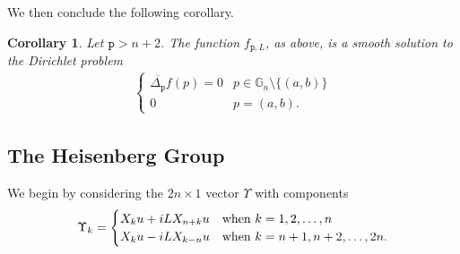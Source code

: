 \documentclass[12pt]{amsart}
\theoremstyle{plain}
\newtheorem{corollary}[theorem]{Corollary}
\theoremstyle{definition}
\numberwithin{equation}{section}
\begin{document}
We then conclude the following corollary.
\begin{corollary}\label{gsmooth}
Let ${\texttt{p}}>n+2$. The function $f_{{\texttt{p}},L}$, as above, is a smooth solution to the Dirichlet problem
\begin{eqnarray*}
\left\{\begin{array}{cc}
\overline{\Delta_{\texttt{p}}}f(p)=0 & p \in \mathbb{G}_n\setminus\{(a,b)\} \\
0 & p = (a,b).
\end{array}\right.
\end{eqnarray*}
\end{corollary}
\subsection{The Heisenberg Group}
We begin by considering the $2n\times 1$ vector $\Upsilon$ with components 
\begin{eqnarray*}
\Upsilon_k= \begin{cases}
X_ku+iLX_{n+k}u & \textmd{when $k=1,2,\ldots, n$} \\
X_{k}u-iLX_{k-n}u & \textmd {when $k=n+1, n+2, \ldots, 2n$}.
\end{cases}
\end{eqnarray*}
\end{document}
